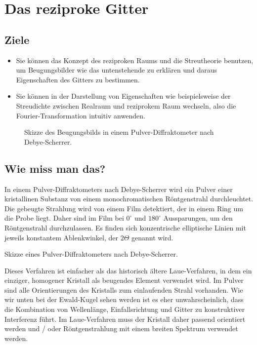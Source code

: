 \renewcommand{\chapterauthors}{Markus Lippitz}
\renewcommand{\lastmod}{21. Dezember 2021}


\chapter{Das reziproke Gitter}


\section{Ziele}

\begin{itemize}
\item Sie können das Konzept des reziproken Raums und die Streutheorie benutzen, um Beugungsbilder wie das untenstehende zu erklären und daraus Eigenschaften des Gitters zu bestimmen.

\item Sie können in der Darstellung von Eigenschaften wie beispielsweise der Streudichte zwischen Realraum und reziprokem Raum wechseln, also die Fourier-Transformation intuitiv anwenden.
\end{itemize}


\begin{figure}
  \caption{Skizze des Beugungsbilds in einem Pulver-Diffraktometer nach Debye-Scherrer.}
\end{figure}




\section{Wie miss man das?}

In einem  Pulver-Diffraktometers  nach Debye-Scherrer wird ein Pulver einer kristallinen Substanz von einem monochromatischen Röntgenstrahl durchleuchtet. Die gebeugte Strahlung wird von einem Film detektiert, der in einem Ring um die Probe liegt. Daher sind im Film bei $0^\circ$ und $180^\circ$ Aussparungen, um den Röntgenstrahl durchzulassen. Es finden sich konzentrische elliptische Linien mit jeweils konstantem Ablenkwinkel, der $2\Theta$ genannt wird.

\begin{marginfigure}
  \caption{Skizze  eines Pulver-Diffraktometers nach Debye-Scherrer.}
\end{marginfigure}

Dieses Verfahren ist einfacher als das historisch ältere Laue-Verfahren, in dem ein einziger, homogener Kristall als beugendes Element verwendet wird. Im Pulver sind alle Orientierungen  des Kristalls zum einlaufenden Strahl vorhanden. Wie wir unten bei der Ewald-Kugel sehen werden ist es eher unwahrscheinlich, dass die Kombination von Wellenlänge, Einfallsrichtung und Gitter zu konstruktiver Interferenz führt. Im Laue-Verfahren muss der Kristall daher passend orientiert werden und / oder Röntgenstrahlung mit einem breiten Spektrum verwendet werden.

